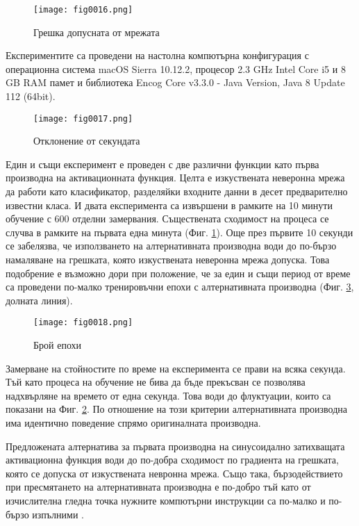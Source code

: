 \begin{figure}[H]
  \centering
  \texttt{[image: fig0016.png]}
  \caption{Грешка допусната от мрежата}
\label{fig0016}
\end{figure}

Експериментите са проведени на настолна компютърна конфигурация с операционна система macOS Sierra 10.12.2, процесор 2.3 GHz Intel Core i5 и 8 GB RAM памет и библиотека Encog Core v3.3.0 - Java Version, Java 8 Update 112 (64bit).

\begin{figure}[H]
  \centering
  \texttt{[image: fig0017.png]}
  \caption{Отклонение от секундата}
\label{fig0017}
\end{figure}

Един и същи експеримент е проведен с две различни функции като първа производна на активационната функция. Целта е изкуствената неверонна мрежа да работи като класификатор, разделяйки входните данни в десет предварително известни класа. И двата експеримента са извършени в рамките на 10 минути обучение с 600 отделни замервания. Съществената сходимост на процеса се случва в рамките на първата една минута (Фиг. \ref{fig0016}). Още през първите 10 секунди се забелязва, че използването на алтернативната производна води до по-бързо намаляване на грешката, която изкуствената неверонна мрежа допуска. Това подобрение е възможно дори при положение, че за един и същи период от време са проведени по-малко тренировъчни епохи с алтернативната производна (Фиг. \ref{fig0018}, долната линия).

\begin{figure}[H]
  \centering
  \texttt{[image: fig0018.png]}
  \caption{Брой епохи}
\label{fig0018}
\end{figure}

Замерване на стойностите по време на експеримента се прави на всяка секунда. Тъй като процеса на обучение не бива да бъде прекъсван се позволява надхвърляне на времето от една секунда. Това води до флуктуации, които са показани на Фиг. \ref{fig0017}. По отношение на този критерии алтернативната производна има идентично поведение спрямо оригиналната производна.

Предложената алтернатива за първата производна на синусоидално затихващата активационна функция води до по-добра сходимост по градиента на грешката, която се допуска от изкуствената невронна мрежа. Също така, бързодействието при пресмятането на алтернативната производна е по-добро тъй като от изчислителна гледна точка нужните компютърни инструкции са по-малко и по-бързо изпълними \cite{Zankinski-01}.

